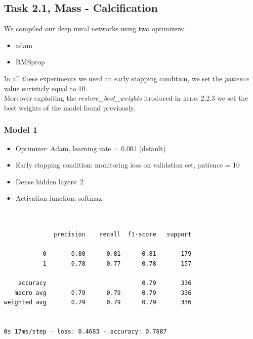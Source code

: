 \documentclass{article}
\begin{document}
\subsection{Task 2.1, Mass - Calcification}
We compiled our deep nural networks using two optimizers:
\begin{itemize}
\item adam
\item RMSprop
\end{itemize}
In all these experiments we used an early stopping condition, we set the \textit{patience} value euristicly equal to 10. \\
Moreover exploiting the \textit{restore\_best\_weights} itroduced in keras 2.2.3 we set the best weights of the model found previously.
\subsubsection{Model 1}

\begin{itemize}
\item Optimizer: Adam, learning rate = 0.001 (default)
\item Early stopping condition: monitoring loss on validation set, patience = 10
\item Dense hidden layers: 2
\item Activation function: softmax
\end{itemize}

\begin{verbatim}


              precision    recall  f1-score   support

           0       0.80      0.81      0.81       179
           1       0.78      0.77      0.78       157

    accuracy                           0.79       336
   macro avg       0.79      0.79      0.79       336
weighted avg       0.79      0.79      0.79       336


0s 17ms/step - loss: 0.4683 - accuracy: 0.7887

\end{verbatim}
\end{document}
